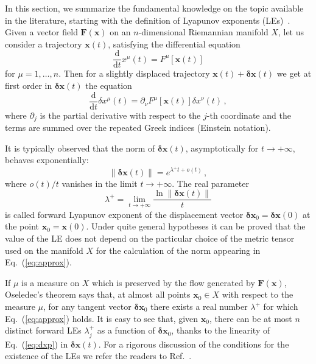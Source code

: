 \documentclass{article}
\theoremstyle{plain}
\theoremstyle{definition}
\theoremstyle{remark}
\newcommand{\vect}[1]{\boldsymbol{#1}}
\begin{document}
In this section, we summarize the fundamental knowledge on the topic
available in the literature, starting with the definition of Lyapunov
exponents (LEs)~\cite{pikovsky}.  Given a vector field
$\vect{F}(\vect{x})$ on an $n$-dimensional Riemannian manifold $X$,
let us consider a trajectory $\vect{x}(t)$, satisfying the
differential equation
\begin{equation}
  \frac{\mathrm{d}}{\mathrm{d}t} x^{\mu}(t) = 
  F^{\mu}\left[\vect{x}(t)\right] 
  \label{eq:xp}
\end{equation}
for $\mu=1,\dots, n$.
Then for a slightly displaced trajectory $\vect{x}(t)+\vect{\delta x}(t)$
we get at first order in $\vect{\delta x}(t)$ the equation
\begin{equation}
  \frac{\mathrm{d}}{\mathrm{d}t} \delta x^{\mu}(t) = 
  \partial_\nu F^{\mu}\left[\vect{x}(t)\right] \delta x^{\nu}(t) \, ,
  \label{eq:dxp}
\end{equation}
where $\partial_j$ is the partial derivative with respect to the
$j$-th coordinate and the terms are summed over the repeated Greek indices
(Einstein notation). 

It is typically observed that
the norm of $\vect{\delta x}(t)$,
asymptotically for $t\to +\infty$, behaves exponentially:
\begin{equation}
 \lVert \vect{\delta x}(t) \rVert =
 e^{\lambda^+ t + o(t)}  \, ,
   \label{eq:approx}
\end{equation}
where $o(t)/t$ vanishes in the limit $t\to +\infty$. The real parameter
\[
\lambda^+= \lim_{t\to +\infty} \frac{\ln \lVert \vect{\delta x}(t) \rVert}{t}
\]
is called forward Lyapunov exponent of the 
displacement vector $\vect{\delta x}_0=\vect{\delta x}(0)$
at the point $\vect{x}_0=\vect{x}(0)$. Under
quite general hypotheses it can be proved  that the value of
the LE does not depend on the particular choice of the metric tensor
used on the manifold $X$ for the calculation of the norm appearing in
Eq.~(\ref{eq:approx}).

If $\mu$ is a measure on $X$ which is preserved by the flow generated by
$\vect{F}(\vect{x})$, Oseledec's theorem \cite{Oseledec1968} says that,
at almost all points
$\vect{x}_0\in X$ with respect to the measure $\mu$,
for any tangent vector $\vect{\delta x}_0$ there exists a real number
$\lambda^+$ for which Eq.~(\ref{eq:approx}) holds.
It is easy to see that, given $\vect{x}_0$, there can be at most $n$
distinct forward LEs $\lambda_j^+$ as a function of $\vect{\delta
  x}_0$, thanks to the linearity of Eq.~(\ref{eq:dxp}) in
$\vect{\delta x}(t)$. For a rigorous discussion of the
conditions for the existence of the LEs we refer the readers to
Ref.~\cite{eckmann1985}.
\end{document}
